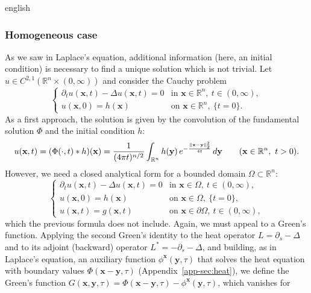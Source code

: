 \documentclass[0000.tex]{subfiles}
\begin{document}
\begin{hyphenrules}{english}
\subsubsection{Homogeneous case}
As we saw in Laplace's equation, additional information (here, an initial condition) is necessary to
find a unique solution which is not trivial. Let $u\in C^{2,1}(\mathbb{R}^n\times(0,\infty))$ and consider the
Cauchy problem
\begin{equation}
  \begin{cases}
    \partial_t u(\mathbf{x},t)-\Delta u(\mathbf{x},t)=0 & \text{in } \mathbf{x}\in\mathbb{R}^n,\ t\in(0,\infty),\\
    u(\mathbf{x},0)=h(\mathbf{x}) & \text{on } \mathbf{x}\in\mathbb{R}^n,\ \{t=0\}.
  \end{cases}
  \label{eq:heat-cauchy}
\end{equation}
As a first approach, the solution is given by the convolution of the fundamental solution $\Phi$ and
the initial condition $h$:
\begin{equation}
  u(\mathbf{x},t)=(\Phi(\cdot,t)*h)(\mathbf{x})=\frac{1}{(4\pi t)^{n/2}}\int_{\mathbb{R}^n}h(\mathbf{y})\,
  e^{-\frac{\norm{\mathbf{x}-\mathbf{y}}_2^2}{4t}}\,d\mathbf{y}\qquad(\mathbf{x}\in\mathbb{R}^n,\ t>0).
  \label{eq:heat-convolution}
\end{equation}
However, we need a closed analytical form for a bounded domain $\Omega\subset\mathbb{R}^n$:
\begin{equation}
  \begin{cases}
    \partial_t u(\mathbf{x},t)-\Delta u(\mathbf{x},t)=0 & \text{in } \mathbf{x}\in\Omega,\ t\in(0,\infty),\\
    u(\mathbf{x},0)=h(\mathbf{x}) & \text{on } \mathbf{x}\in\Omega,\ \{t=0\},\\
    u(\mathbf{x},t)=g(\mathbf{x},t) & \text{on } \mathbf{x}\in\partial\Omega,\ t\in(0,\infty),
  \end{cases}
  \label{eq:heat-ibvp}
\end{equation}
which the previous formula does not include. Again, we must appeal to a Green's function. Applying the
second Green's identity to the heat operator $L=\partial_s-\Delta$ and to its adjoint (backward) operator
$L^{*}=-\partial_s-\Delta$, and building, as in Laplace's equation, an auxiliary function
$\phi^{\mathbf{x}}(\mathbf{y},\tau)$ that solves the heat equation with boundary values
$\Phi(\mathbf{x}-\mathbf{y},\tau)$ (Appendix~\ref{app-sec:heat}), we define the Green's function
$G(\mathbf{x},\mathbf{y},\tau)=\Phi(\mathbf{x}-\mathbf{y},\tau)-\phi^{\mathbf{x}}(\mathbf{y},\tau)$, which vanishes for

\end{hyphenrules}
\end{document}
